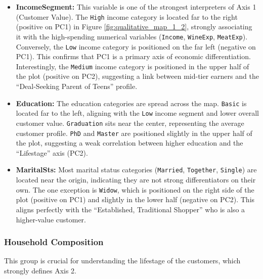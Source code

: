 \begin{itemize}
    \item \textbf{IncomeSegment:} This variable is one of the strongest interpreters of Axis 1 (Customer Value). The \texttt{High} income category is located far to the right (positive on PC1) in Figure \ref{fig:qualitative_map_1_2}, strongly associating it with the high-spending numerical variables (\texttt{Income}, \texttt{WineExp}, \texttt{MeatExp}). Conversely, the \texttt{Low} income category is positioned on the far left (negative on PC1). This confirms that PC1 is a primary axis of economic differentiation. Interestingly, the \texttt{Medium} income category is positioned in the upper half of the plot (positive on PC2), suggesting a link between mid-tier earners and the ``Deal-Seeking Parent of Teens'' profile.
    
    \item \textbf{Education:} The education categories are spread across the map. \texttt{Basic} is located far to the left, aligning with the \texttt{Low} income segment and lower overall customer value. \texttt{Graduation} sits near the center, representing the average customer profile. \texttt{PhD} and \texttt{Master} are positioned slightly in the upper half of the plot, suggesting a weak correlation between higher education and the ``Lifestage'' axis (PC2).
    
    \item \textbf{MaritalSts:} Most marital status categories (\texttt{Married}, \texttt{Together}, \texttt{Single}) are located near the origin, indicating they are not strong differentiators on their own. The one exception is \texttt{Widow}, which is positioned on the right side of the plot (positive on PC1) and slightly in the lower half (negative on PC2). This aligns perfectly with the ``Established, Traditional Shopper'' who is also a higher-value customer.
\end{itemize}

\subsubsection{Household Composition}

This group is crucial for understanding the lifestage of the customers, which strongly defines Axis 2.

